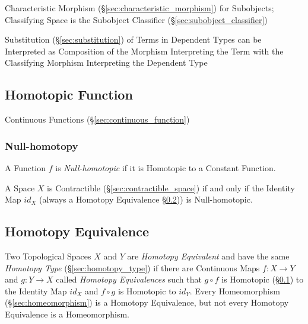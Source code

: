 Characteristic Morphism (\S\ref{sec:characteristic_morphism}) for
Subobjects; Classifying Space is the Subobject Classifier
(\S\ref{sec:subobject_classifier})

Substitution (\S\ref{sec:substitution}) of Terms in Dependent Types
can be Interpreted as Composition of the Morphism Interpreting the
Term with the Classifying Morphism Interpreting the Dependent Type



\subsection{Homotopic Function}\label{sec:homotopic_function}

Continuous Functions (\S\ref{sec:continuous_function})



\subsubsection{Null-homotopy}\label{sec:null_homotopy}

A Function $f$ is \emph{Null-homotopic} if it is Homotopic to a
Constant Function.

A Space $X$ is Contractible (\S\ref{sec:contractible_space}) if and
only if the Identity Map $id_X$ (always a Homotopy Equivalence
\S\ref{sec:homotopy_equivalence})) is Null-homotopic.



\subsection{Homotopy Equivalence}\label{sec:homotopy_equivalence}

Two Topological Spaces $X$ and $Y$ are \emph{Homotopy Equivalent} and
have the same \emph{Homotopy Type} (\S\ref{sec:homotopy_type}) if
there are Continuous Maps $f : X \rightarrow Y$ and $g : Y \rightarrow
X$ called \emph{Homotopy Equivalences} such that $g \circ f$ is
Homotopic (\S\ref{sec:homotopic_function}) to the Identity Map $id_X$
and $f \circ g$ is Homotopic to $id_Y$. Every Homeomorphism
(\S\ref{sec:homeomorphism}) is a Homotopy Equivalence, but not every
Homotopy Equivalence is a Homeomorphism.

